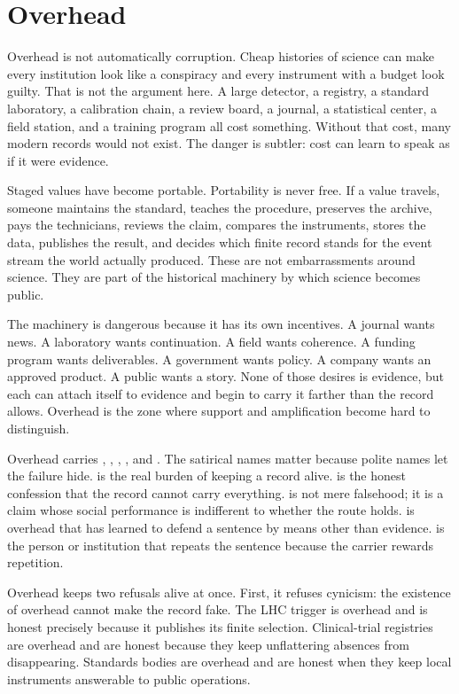 \chapter{Overhead}
\label{chap:overhead}

\begin{chapteressay}
Overhead is not automatically corruption. Cheap histories of science can
make every institution look like a conspiracy and every instrument with a
budget look guilty. That is not the argument here. A large detector, a
registry, a standard laboratory, a calibration chain, a review board, a
journal, a statistical center, a field station, and a training program all
cost something. Without that cost, many modern records would not exist. The
danger is subtler: cost can learn to speak as if it were evidence.

Staged values have become portable. Portability is never free. If a value
travels, someone maintains the standard, teaches the procedure, preserves
the archive, pays the technicians, reviews the claim, compares the
instruments, stores the data, publishes the result, and decides which
finite record stands for the event stream the world actually produced.
These are not embarrassments around science. They are part of the
historical machinery by which science becomes public.

The machinery is dangerous because it has its own incentives. A journal
wants news. A laboratory wants continuation. A field wants coherence. A
funding program wants deliverables. A government wants policy. A company
wants an approved product. A public wants a story. None of those desires is
evidence, but each can attach itself to evidence and begin to carry it
farther than the record allows. Overhead is the zone where support and
amplification become hard to distinguish.

Overhead carries , , ,
, and . The satirical names matter because
polite names let the failure hide.  is the real burden of
keeping a record alive.  is the honest confession
that the record cannot carry everything.  is not mere
falsehood; it is a claim whose social performance is indifferent to whether
the route holds.  is overhead that has learned to defend a
sentence by means other than evidence.  is the person or
institution that repeats the sentence because the carrier rewards
repetition.

Overhead keeps two refusals alive at once. First, it refuses cynicism: the
existence of overhead cannot make the record fake. The LHC trigger is
overhead and is honest precisely because it publishes its finite selection.
Clinical-trial registries are overhead and are honest because they keep
unflattering absences from disappearing. Standards bodies are overhead and
are honest when they keep local instruments answerable to public
operations.


\end{chapteressay}
